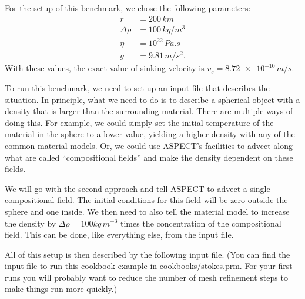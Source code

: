 \documentclass{article}
\newcommand{\aspect}{\textsc{ASPECT}}
\begin{document}
For the setup of this benchmark, we chose the following parameters:
\begin{align*}
  \label{eq:stokes-parameters}
  r &= 200 \, \si{km}\\
  \Delta\rho &= 100 \, \si{kg}/\si{m}^3\\
  \eta &= 10^{22} \, \si{Pa.s}\\
  g &= 9.81 \, \si{m}/\si{s}^2.
\end{align*}
With these values, the exact value of sinking velocity is $v_s =
\num{8.72e-10} \, \si{m}/\si{s}$.

To run this benchmark, we need to set up an input file that describes the
situation. In principle, what we need to do is to describe a spherical object
with a density that is larger than the surrounding material. There are multiple
ways of doing this. For example, we could simply set the initial temperature of
the material in the sphere to a lower value, yielding a higher density with any
of the common material models. Or, we could use \aspect{}'s facilities to advect
along what are called ``compositional fields'' and make the density dependent on
these fields.

We will go with the second approach and tell \aspect{} to advect a single
compositional field. The initial conditions for this field will be zero outside
the sphere and one inside. We then need to also tell the material model to
increase the density by $\Delta\rho=100 kg\, m^{-3}$ times the concentration of
the compositional field. This can be done, like everything else, from the input
file.

All of this setup is then described by the following input file.
(You can find the input file to run this cookbook example in
\url{cookbooks/stokes.prm}. For your first runs you will probably want to
reduce the number of mesh refinement steps to make things run more quickly.)


\end{document}
